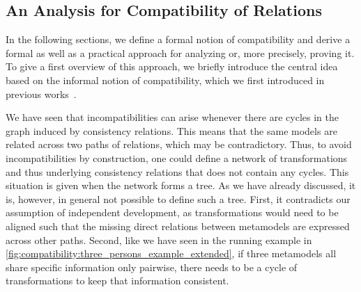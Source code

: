 \subsection{An Analysis for Compatibility of Relations}

In the following sections, we define a formal notion of compatibility and derive a formal as well as a practical approach for analyzing or, more precisely, proving it.
To give a first overview of this approach, we briefly introduce the central idea based on the informal notion of compatibility, which we first introduced in previous works~.

We have seen that incompatibilities can arise whenever there are cycles in the graph induced by consistency relations.
This means that the same models are related across two paths of relations, which may be contradictory.
Thus, to avoid incompatibilities by construction, one could define a network of transformations and thus underlying consistency relations that does not contain any cycles.
This situation is given when the network forms a tree.
As we have already discussed, it is, however, in general not possible to define such a tree.
First, it contradicts our assumption of independent development, as transformations would need to be aligned such that the missing direct relations between metamodels are expressed across other paths.
Second, like we have seen in the running example in \autoref{fig:compatibility:three_persons_example_extended}, if three metamodels all share specific information only pairwise, there needs to be a cycle of transformations to keep that information consistent.

